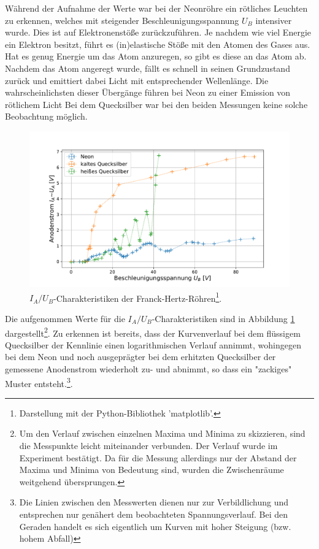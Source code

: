 	Während der Aufnahme der Werte war bei der Neonröhre ein rötliches Leuchten zu erkennen, welches mit steigender Beschleunigungsspannung $U_B$ intensiver wurde. 
	Dies ist auf Elektronenstöße zurückzuführen.
	Je nachdem wie viel Energie ein Elektron besitzt, führt es (in)elastische Stöße mit den Atomen des Gases aus. 
	Hat es genug Energie um das Atom anzuregen, so gibt es diese an das Atom ab.
	Nachdem das Atom angeregt wurde, fällt es schnell in seinen Grundzustand zurück und emittiert dabei Licht mit entsprechender Wellenlänge.
	Die wahrscheinlichsten dieser Übergänge führen bei Neon zu einer Emission von rötlichem Licht 
	Bei dem Quecksilber war bei den beiden Messungen keine solche Beobachtung möglich.
	
	\begin{figure}[ht]
		\centering
		\includegraphics[width=\textwidth]{data/CharakteristikZusammen.pdf}
		\caption{$I_A/U_B$-Charakteristiken der Franck-Hertz-Röhren\footnote{Darstellung mit der Python-Bibliothek 'matplotlib'.}.}
		\label{fig:Kurve}	
	\end{figure}
	Die aufgenommen Werte für die $I_A/U_B$-Charakteristiken sind in Abbildung \ref{fig:Kurve} dargestellt\footnote{Um den Verlauf zwischen einzelnen Maxima und Minima zu skizzieren, sind die Messpunkte leicht miteinander verbunden. Der Verlauf wurde im Experiment bestätigt. Da für die Messung allerdings nur der Abstand der Maxima und Minima von Bedeutung sind, wurden die Zwischenräume weitgehend übersprungen.}. 
	Zu erkennen ist bereits, dass der Kurvenverlauf bei dem flüssigem Quecksilber der Kennlinie einen logarithmischen Verlauf annimmt, wohingegen bei dem Neon und noch ausgeprägter bei dem erhitzten Quecksilber der gemessene Anodenstrom wiederholt zu- und abnimmt, so dass ein "zackiges" Muster entsteht.\footnote{Die Linien zwischen den Messwerten dienen nur zur Verbildlichung und entsprechen nur genähert dem beobachteten Spannungsverlauf. Bei den Geraden handelt es sich eigentlich um  Kurven mit hoher Steigung (bzw. hohem Abfall)}. 

